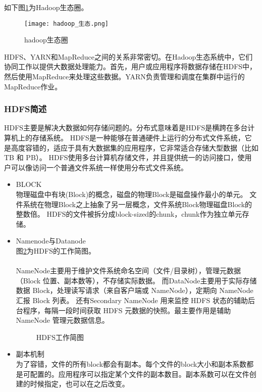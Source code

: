 \documentclass[bachelor]{thesis-uestc}
\begin{document}
如下图\ref{hadoop_shengtai}为Hadoop生态圈。

\begin{figure}[htbp]
    \centering
    \texttt{[image: hadoop\_生态.png]}
    \caption{hadoop生态圈\cite{hadoop_sheng}}
    \label{hadoop_shengtai}

\end{figure}
HDFS、YARN和MapReduce之间的关系非常密切。在Hadoop生态系统中，它们协同工作以提供大数据处理能力。首先，用户或应用程序将数据存储在HDFS中，然后使用MapReduce来处理这些数据。YARN负责管理和调度在集群中运行的MapReduce作业。

\subsubsection{HDFS简述}
HDFS主要是解决大数据如何存储问题的。分布式意味着是HDFS是横跨在多台计算机上的存储系统。
HDFS是一种能够在普通硬件上运行的分布式文件系统，它是高度容错的，适应于具有大数据集的应用程序，它非常适合存储大型数据（比如 TB 和 PB）。
HDFS使用多台计算机存储文件，并且提供统一的访问接口，使用户可以像访问一个普通文件系统一样使用分布式文件系统。

\begin{itemize}
\item BLOCK\\
物理磁盘中有块(Block)的概念，磁盘的物理Block是磁盘操作最小的单元。
文件系统在物理Block之上抽象了另一层概念，文件系统Block物理磁盘Block的整数倍。
HDFS的文件被拆分成block-sized的chunk，chunk作为独立单元存储。

\item Namenode与Datanode\\
图\ref{hdfs_}为HDFS的工作简图。\\
\\
NameNode主要用于维护文件系统命名空间（文件/目录树），管理元数据（Block 位置、副本数等），不存储实际数据。
而DataNode主要用于实际存储数据 Block，处理读写请求（来自客户端或 NameNode），定期向 NameNode 汇报 Block 列表。
还有Secondary NameNode 用来监控 HDFS 状态的辅助后台程序，每隔一段时间获取 HDFS 元数据的快照。最主要作用是辅助 NameNode 管理元数据信息。

\begin{figure}[htbp]
\caption{HDFS工作简图}
\label{hdfs_}
\end{figure}

\item 副本机制\\
为了容错，文件的所有block都会有副本。每个文件的block大小和副本系数都是可配置的。应用程序可以指定某个文件的副本数目。副本系数可以在文件创建的时候指定，也可以在之后改变。

\end{itemize}
\end{document}
